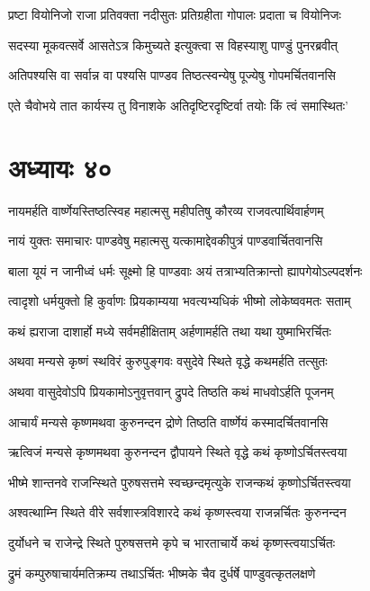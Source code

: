 \twolineshloka
{प्रष्टा वियोनिजो राजा प्रतिवक्ता नदीसुतः}
{प्रतिग्रहीता गोपालः प्रदाता च वियोनिजः}


\twolineshloka
{सदस्या मूकवत्सर्वे आसतेऽत्र किमुच्यते}
{इत्युक्त्वा स विहस्याशु पाण्डुं पुनरब्रवीत्}


\twolineshloka
{अतिपश्यसि वा सर्वान्न वा पश्यसि पाण्डव}
{तिष्ठत्स्वन्येषु पूज्येषु गोपमर्चितवानसि}


\twolineshloka
{एते चैवोभये तात कार्यस्य तु विनाशके}
{अतिदृष्टिरदृष्टिर्वा तयोः किं त्वं समास्थितः'}


\chapter{अध्यायः ४०}
\twolineshloka
{नायमर्हति वार्ष्णेयस्तिष्ठत्स्विह महात्मसु}
{महीपतिषु कौरव्य राजवत्पार्थिवार्हणम्}


\twolineshloka
{नायं युक्तः समाचारः पाण्डवेषु महात्मसु}
{यत्कामाद्देवकीपुत्रं पाण्डवार्चितवानसि}


\twolineshloka
{बाला यूयं न जानीध्वं धर्मः सूक्ष्मो हि पाण्डवाः}
{अयं तत्राभ्यतिक्रान्तो ह्यापगेयोऽल्पदर्शनः}


\twolineshloka
{त्वादृशो धर्मयुक्तो हि कुर्वाणः प्रियकाम्यया}
{भवत्यभ्यधिकं भीष्मो लोकेष्ववमतः सताम्}


\twolineshloka
{कथं ह्यराजा दाशार्हो मध्ये सर्वमहीक्षिताम्}
{अर्हणामर्हति तथा यथा युष्माभिरर्चितः}


\twolineshloka
{अथवा मन्यसे कृष्णं स्थविरं कुरुपुङ्गवः}
{वसुदेवे स्थिते वृद्धे कथमर्हति तत्सुतः}


\twolineshloka
{अथवा वासुदेवोऽपि प्रियकामोऽनुवृत्तवान्}
{द्रुपदे तिष्ठति कथं माधवोऽर्हति पूजनम्}


\twolineshloka
{आचार्यं मन्यसे कृष्णमथवा कुरुनन्दन}
{द्रोणे तिष्ठति वार्ष्णेयं कस्मादर्चितवानसि}


\twolineshloka
{ऋत्विजं मन्यसे कृष्णमथवा कुरुनन्दन}
{द्वौपायने स्थिते वृद्धे कथं कृष्णोऽर्चितस्त्वया}


\twolineshloka
{भीष्मे शान्तनवे राजन्स्थिते पुरुषसत्तमे}
{स्वच्छन्दमृत्युके राजन्कथं कृष्णोऽर्चितस्त्वया}


\twolineshloka
{अश्वत्थाम्नि स्थिते वीरे सर्वशास्त्रविशारदे}
{कथं कृष्णस्त्वया राजन्नर्चितः कुरुनन्दन}


\twolineshloka
{दुर्योधने च राजेन्द्रे स्थिते पुरुषसत्तमे}
{कृपे च भारताचार्ये कथं कृष्णस्त्वयाऽर्चितः}


\twolineshloka
{द्रुमं कम्पुरुषाचार्यमतिक्रम्य तथाऽर्चितः}
{भीष्मके चैव दुर्धर्षे पाण्डुवत्कृतलक्षणे}


